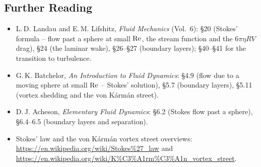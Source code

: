 \documentclass[../main.tex]{subfiles}
\begin{document}
\subsection*{Further Reading}
\begin{itemize}
  \item L.\,D. Landau and E.\,M. Lifshitz, \textit{Fluid Mechanics} (Vol.\ 6): \S20 (Stokes' formula -- flow past a sphere at small $\mathrm{Re}$, the stream function and the $6\pi\eta R V$ drag), \S24 (the laminar wake), \S26--\S27 (boundary layers); \S40--\S41 for the transition to turbulence.
  \item G.\,K. Batchelor, \textit{An Introduction to Fluid Dynamics}: \S4.9 (flow due to a moving sphere at small $\mathrm{Re}$ -- Stokes' solution), \S5.7 (boundary layers), \S5.11 (vortex shedding and the von Kármán street).
  \item D.\,J. Acheson, \textit{Elementary Fluid Dynamics}: \S6.2 (Stokes flow past a sphere), \S6.4--6.5 (boundary layers and separation).
  \item Stokes' law and the von Kármán vortex street overviews: \url{https://en.wikipedia.org/wiki/Stokes\%27_law} and \url{https://en.wikipedia.org/wiki/K\%C3\%A1rm\%C3\%A1n_vortex_street}.
\end{itemize}
\end{document}
